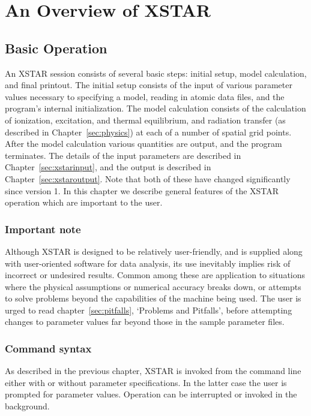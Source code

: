 \chapter{An Overview of XSTAR}
\label{sec:overview}

\section{Basic Operation}

An XSTAR session consists of several basic steps: initial setup, 
model calculation, and final printout.  
The initial setup consists of the input of various parameter values necessary to specifying 
a model, reading in atomic data files, and the  program's internal 
initialization.
The model calculation consists of the 
calculation of ionization, excitation, and thermal equilibrium, and 
radiation transfer (as described in Chapter~\ref{sec:physics}) at each of a number of 
spatial grid points.  After the model calculation various quantities are output, and the 
program terminates. The details of the input parameters are described in 
Chapter~\ref{sec:xstarinput}, and the output is described in Chapter~\ref{sec:xstaroutput}.  
Note that both of these have 
changed significantly since version 1.  In this chapter we describe general 
features of the XSTAR operation which are important to the user.

\subsection{Important note}

Although XSTAR is designed to be relatively user-friendly, and is 
supplied along with user-oriented software for data analysis, its 
use inevitably implies risk of incorrect or undesired results.  
Common among these are application to situations where the physical 
assumptions or numerical accuracy breaks down, or attempts to solve 
problems beyond the capabilities of the machine being used.
The user is urged to read chapter~\ref{sec:pitfalls}, `Problems and Pitfalls', before
attempting changes to parameter values far beyond those in the sample
parameter files.

\subsection{Command syntax}

As described in the previous chapter, XSTAR is invoked from the command line either 
with or without parameter specifications.  In the latter case the user is 
prompted for parameter values.  Operation can be interrupted or invoked in the 
background.

